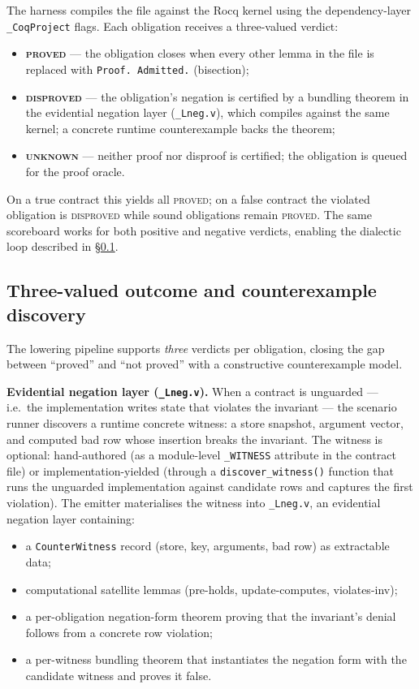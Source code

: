 \documentclass[11pt,a4paper]{article}
\begin{document}
\noindent The harness compiles the file against the Rocq kernel
using the dependency-layer \texttt{\_CoqProject} flags.  Each
obligation receives a three-valued verdict:
\begin{itemize}[nosep]
\item \textbf{\textsc{proved}} — the obligation closes when
  every other lemma in the file is replaced with
  \texttt{Proof. Admitted.} (bisection);
\item \textbf{\textsc{disproved}} — the obligation's negation is
  certified by a bundling theorem in the evidential negation
  layer (\texttt{\_Lneg.v}), which compiles against the same
  kernel; a concrete runtime counterexample backs the theorem;
\item \textbf{\textsc{unknown}} — neither proof nor disproof is
  certified; the obligation is queued for the proof oracle.
\end{itemize}
On a true contract this yields all \textsc{proved}; on a false
contract the violated obligation is \textsc{disproved} while
sound obligations remain \textsc{proved}.  The same scoreboard
works for both positive and negative verdicts, enabling the
dialectic loop described in \S\ref{sec:lowering-counter}.

\subsection{Three-valued outcome and counterexample discovery}
\label{sec:lowering-counter}

The lowering pipeline supports \emph{three} verdicts per obligation,
closing the gap between ``proved'' and ``not proved'' with a
constructive counterexample model.

\textbf{Evidential negation layer (\texttt{\_Lneg.v}).}  When a
contract is unguarded --- i.e.\ the implementation writes state that
violates the invariant --- the scenario runner discovers a runtime
concrete witness: a store snapshot, argument vector, and computed bad
row whose insertion breaks the invariant.  The witness is optional:
hand-authored (as a module-level \texttt{\_WITNESS} attribute in the
contract file) or implementation-yielded (through a
\texttt{discover\_witness()} function that runs the unguarded
implementation against candidate rows and captures the first
violation).  The emitter materialises the witness into
\texttt{\_Lneg.v}, an evidential negation layer containing:
\begin{itemize}[nosep]
\item a \texttt{CounterWitness} record (store, key, arguments, bad
  row) as extractable data;
\item computational satellite lemmas (pre-holds, update-computes,
  violates-inv);
\item a per-obligation negation-form theorem proving that the
  invariant's denial follows from a concrete row violation;
\item a per-witness bundling theorem that instantiates the negation
  form with the candidate witness and proves it false.
\end{itemize}
\end{document}
